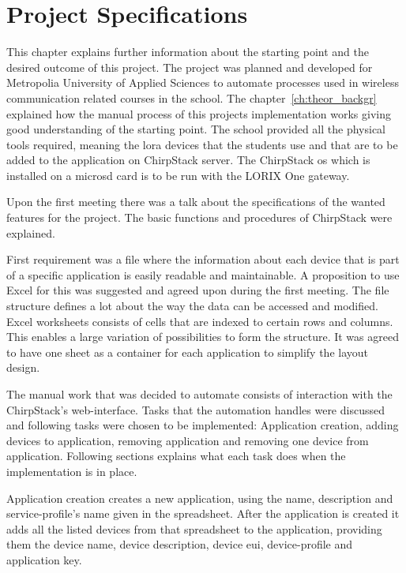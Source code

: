 
\chapter{Project Specifications} \label{ch:project_spec}
This chapter explains further information about the starting point and the desired outcome of this project.
The project was planned and developed for Metropolia University of Applied Sciences to automate processes used in wireless communication related courses in the school.
The chapter~\ref{ch:theor_backgr} explained how the manual process of this projects implementation works giving good understanding of the starting point.
The school provided all the physical tools required, meaning the \gls{lora} devices that the students use and that are to be added to the application on ChirpStack server.
The ChirpStack \gls{os} which is installed on a micro\gls{sd} card is to be run with the LORIX One gateway.

Upon the first meeting there was a talk about the specifications of the wanted features for the project.
The basic functions and procedures of ChirpStack were explained.

First requirement was a file where the information about each device that is part of a specific application is easily readable and maintainable.
A proposition to use Excel for this was suggested and agreed upon during the first meeting.
The file structure defines a lot about the way the data can be accessed and modified.
Excel worksheets consists of cells that are indexed to certain rows and columns.
This enables a large variation of possibilities to form the structure.
It was agreed to have one sheet as a container for each application to simplify the layout design.

The manual work that was decided to automate consists of interaction with the ChirpStack's web-interface.
Tasks that the automation handles were discussed and following tasks were chosen to be implemented: Application creation, adding devices to application, removing application and removing one device from application.
Following sections explains what each task does when the implementation is in place.

Application creation creates a new application, using the name, description and service-profile's name given in the spreadsheet.
After the application is created it adds all the listed devices from that spreadsheet to the application, providing them the device name, device description, device \gls{eui}, device-profile and application key.

